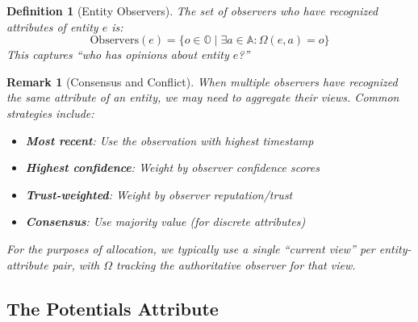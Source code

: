 \documentclass[11pt]{article}
\newtheorem{definition}{Definition}
\newtheorem{remark}{Remark}
\begin{document}
\begin{definition}[Entity Observers]
The set of observers who have recognized attributes of entity $e$ is:
\[
\text{Observers}(e) = \{ o \in \mathbb{O} \mid \exists a \in \mathbb{A}: \Omega(e, a) = o \}
\]
This captures ``who has opinions about entity $e$?''
\end{definition}

\begin{remark}[Consensus and Conflict]
When multiple observers have recognized the same attribute of an entity, we may need to aggregate their views. Common strategies include:
\begin{itemize}
\item \textbf{Most recent}: Use the observation with highest timestamp
\item \textbf{Highest confidence}: Weight by observer confidence scores
\item \textbf{Trust-weighted}: Weight by observer reputation/trust
\item \textbf{Consensus}: Use majority value (for discrete attributes)
\end{itemize}

For the purposes of allocation, we typically use a single ``current view'' per entity-attribute pair, with $\Omega$ tracking the authoritative observer for that view.
\end{remark}

\subsection{The Potentials Attribute}
\end{document}
